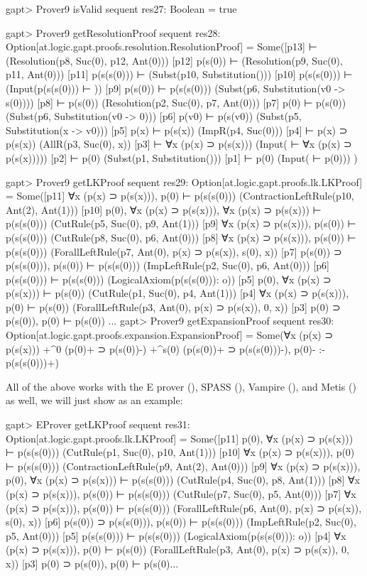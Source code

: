\documentclass[a4paper,11pt]{article}
\newcommand{\cli}[1]{{\ttfamily {#1}}}
\begin{document}
\begin{clilisting}
gapt> Prover9 isValid sequent
res27: Boolean = true

gapt> Prover9 getResolutionProof sequent
res28: Option[at.logic.gapt.proofs.resolution.ResolutionProof] =
Some([p13]  ⊢    (Resolution(p8, Suc(0), p12, Ant(0)))
[p12] p(s(0)) ⊢    (Resolution(p9, Suc(0), p11, Ant(0)))
[p11] p(s(s(0))) ⊢    (Subst(p10, Substitution()))
[p10] p(s(s(0))) ⊢    (Input(p(s(s(0))) ⊢ ))
[p9] p(s(0)) ⊢ p(s(s(0)))   (Subst(p6, Substitution(v0 -> s(0))))
[p8]  ⊢ p(s(0))   (Resolution(p2, Suc(0), p7, Ant(0)))
[p7] p(0) ⊢ p(s(0))   (Subst(p6, Substitution(v0 -> 0)))
[p6] p(v0) ⊢ p(s(v0))   (Subst(p5, Substitution(x -> v0)))
[p5] p(x) ⊢ p(s(x))   (ImpR(p4, Suc(0)))
[p4]  ⊢ p(x) ⊃ p(s(x))   (AllR(p3, Suc(0), x))
[p3]  ⊢ ∀x (p(x) ⊃ p(s(x)))   (Input( ⊢ ∀x (p(x) ⊃ p(s(x)))))
[p2]  ⊢ p(0)   (Subst(p1, Substitution()))
[p1]  ⊢ p(0)   (Input( ⊢ p(0)))
)

gapt> Prover9 getLKProof sequent
res29: Option[at.logic.gapt.proofs.lk.LKProof] =
Some([p11] ∀x (p(x) ⊃ p(s(x))), p(0) ⊢ p(s(s(0)))    (ContractionLeftRule(p10, Ant(2), Ant(1)))
[p10] p(0), ∀x (p(x) ⊃ p(s(x))), ∀x (p(x) ⊃ p(s(x))) ⊢ p(s(s(0)))    (CutRule(p5, Suc(0), p9, Ant(1)))
[p9] ∀x (p(x) ⊃ p(s(x))), p(s(0)) ⊢ p(s(s(0)))    (CutRule(p8, Suc(0), p6, Ant(0)))
[p8] ∀x (p(x) ⊃ p(s(x))), p(s(0)) ⊢ p(s(s(0)))    (ForallLeftRule(p7, Ant(0), p(x) ⊃ p(s(x)), s(0), x))
[p7] p(s(0)) ⊃ p(s(s(0))), p(s(0)) ⊢ p(s(s(0)))    (ImpLeftRule(p2, Suc(0), p6, Ant(0)))
[p6] p(s(s(0))) ⊢ p(s(s(0)))    (LogicalAxiom(p(s(s(0))): o))
[p5] p(0), ∀x (p(x) ⊃ p(s(x))) ⊢ p(s(0))    (CutRule(p1, Suc(0), p4, Ant(1)))
[p4] ∀x (p(x) ⊃ p(s(x))), p(0) ⊢ p(s(0))    (ForallLeftRule(p3, Ant(0), p(x) ⊃ p(s(x)), 0, x))
[p3] p(0) ⊃ p(s(0)), p(0) ⊢ p(s(0))  ...
gapt> Prover9 getExpansionProof sequent
res30: Option[at.logic.gapt.proofs.expansion.ExpansionProof] =
Some(∀x (p(x) ⊃ p(s(x)))
  +^{0} (p(0)+ ⊃ p(s(0))-)
  +^{s(0)} (p(s(0))+ ⊃ p(s(s(0)))-),
p(0)-
:-
p(s(s(0)))+)

\end{clilisting}

All of the above works with the E prover (\cli{EProver}), SPASS (\cli{SPASS}),
Vampire (\cli{Vampire}), and Metis (\cli{Metis}) as well, we will just show
\cli{EProver.getLKProof} as an example:
\begin{clilisting}
gapt> EProver getLKProof sequent
res31: Option[at.logic.gapt.proofs.lk.LKProof] =
Some([p11] p(0), ∀x (p(x) ⊃ p(s(x))) ⊢ p(s(s(0)))    (CutRule(p1, Suc(0), p10, Ant(1)))
[p10] ∀x (p(x) ⊃ p(s(x))), p(0) ⊢ p(s(s(0)))    (ContractionLeftRule(p9, Ant(2), Ant(0)))
[p9] ∀x (p(x) ⊃ p(s(x))), p(0), ∀x (p(x) ⊃ p(s(x))) ⊢ p(s(s(0)))    (CutRule(p4, Suc(0), p8, Ant(1)))
[p8] ∀x (p(x) ⊃ p(s(x))), p(s(0)) ⊢ p(s(s(0)))    (CutRule(p7, Suc(0), p5, Ant(0)))
[p7] ∀x (p(x) ⊃ p(s(x))), p(s(0)) ⊢ p(s(s(0)))    (ForallLeftRule(p6, Ant(0), p(x) ⊃ p(s(x)), s(0), x))
[p6] p(s(0)) ⊃ p(s(s(0))), p(s(0)) ⊢ p(s(s(0)))    (ImpLeftRule(p2, Suc(0), p5, Ant(0)))
[p5] p(s(s(0))) ⊢ p(s(s(0)))    (LogicalAxiom(p(s(s(0))): o))
[p4] ∀x (p(x) ⊃ p(s(x))), p(0) ⊢ p(s(0))    (ForallLeftRule(p3, Ant(0), p(x) ⊃ p(s(x)), 0, x))
[p3] p(0) ⊃ p(s(0)), p(0) ⊢ p(s(0)...
\end{clilisting}
\end{document}

